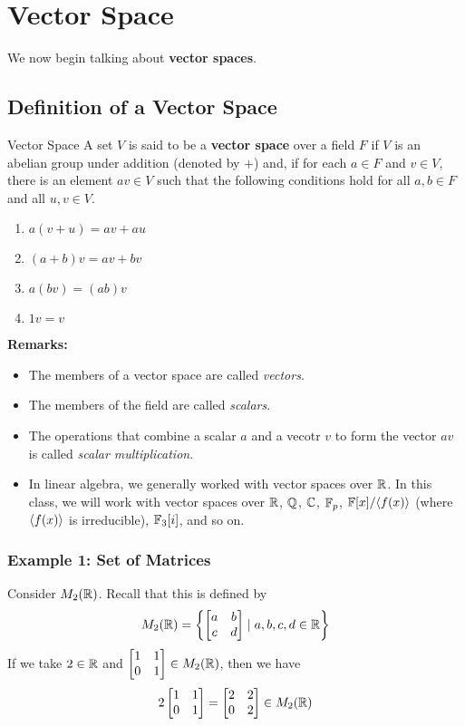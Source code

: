 \documentclass[letterpaper]{article}
\begin{document}
\section{Vector Space}
We now begin talking about \textbf{vector spaces}.

\subsection{Definition of a Vector Space}
\begin{definition}{Vector Space}{}
    A set $V$ is said to be a \textbf{vector space} over a field $F$ if $V$ is an abelian group under addition (denoted by $+$) and, if for each $a \in F$ and $v \in V$, there is an element $av \in V$ such that the following conditions hold for all $a, b \in F$ and all $u, v \in V$.
    \begin{enumerate}
        \item $a(v + u) = av + au$
        \item $(a + b)v = av + bv$
        \item $a(bv) = (ab)v$
        \item $1v = v$
    \end{enumerate}
\end{definition}
\textbf{Remarks:}
\begin{itemize}
    \item The members of a vector space are called \emph{vectors}.
    \item The members of the field are called \emph{scalars}.
    \item The operations that combine a scalar $a$ and a vecotr $v$ to form the vector $av$ is called \emph{scalar multiplication}. 
    \item In linear algebra, we generally worked with vector spaces over $\mathbb{R}$. In this class, we will work with vector spaces over $\mathbb{R}$, $\mathbb{Q}$, $\mathbb{C}$, $\mathbb{F}_p$, $\mathbb{F}[x] / \langle f(x) \rangle$ (where $\langle f(x) \rangle$ is irreducible), $\mathbb{F}_{3}[i]$, and so on.
\end{itemize}

\subsubsection{Example 1: Set of Matrices}
Consider $M_{2}(\mathbb{R})$. Recall that this is defined by 
\[M_{2}(\mathbb{R}) = \left\{\begin{bmatrix}
    a & b \\ c & d
\end{bmatrix} \mid a, b, c, d \in \mathbb{R}\right\}\]
If we take $2 \in \mathbb{R}$ and $\begin{bmatrix}
    1 & 1 \\ 0 & 1
\end{bmatrix} \in M_{2}(\mathbb{R})$, then we have 
\[2 \begin{bmatrix}
    1 & 1 \\ 0 & 1
\end{bmatrix} = \begin{bmatrix}
    2 & 2 \\ 0 & 2
\end{bmatrix} \in M_{2}(\mathbb{R})\]
\end{document}
